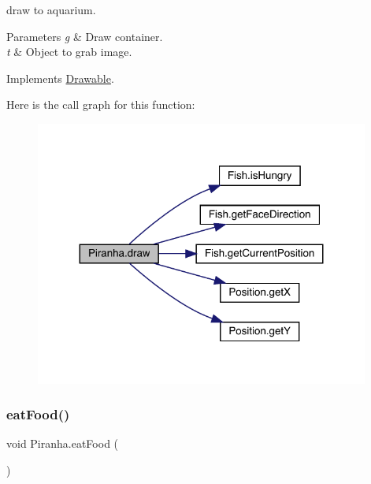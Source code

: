 draw to aquarium. 
\begin{DoxyParams}{Parameters}
{\em g} & Draw container. \\
\hline
{\em t} & Object to grab image. \\
\hline
\end{DoxyParams}


Implements \mbox{\hyperlink{interface_drawable_aaddafb212b3c8e60fcc742052570c893}{Drawable}}.

Here is the call graph for this function\+:
\nopagebreak
\begin{figure}[H]
\begin{center}
\leavevmode
\includegraphics[width=311pt]{class_piranha_a8a06429a9c5b42fb4246f48c54d6cf78_cgraph}
\end{center}
\end{figure}
\mbox{\label{class_piranha_a9310ca27aa9c8fdec55f03ef4fa994e0}} 
\subsubsection{\texorpdfstring{eat\+Food()}{eatFood()}}
{\footnotesize\ttfamily void Piranha.\+eat\+Food (\begin{DoxyParamCaption}{ }\end{DoxyParamCaption})\hspace{0.3cm}{\ttfamily [inline]}}

